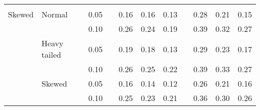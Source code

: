 \begin{table}[ht]
\begin{scriptsize}
\begin{tabular}{ll p{.1cm} c p{.1cm} rrr p{.1cm} rrr}
             &&&&&&&&&&&\\
Skewed       & Normal       && 0.05 &&  0.16 & 0.16 & 0.13 && 0.28 & 0.21 & 0.15 \\ 
             &              && 0.10 &&  0.26 & 0.24 & 0.19 && 0.39 & 0.32 & 0.27 \\ 
             & Heavy tailed && 0.05 &&  0.19 & 0.18 & 0.13 && 0.29 & 0.23 & 0.17 \\ 
             &              && 0.10 &&  0.26 & 0.25 & 0.22 && 0.39 & 0.33 & 0.27 \\ 
             & Skewed       && 0.05 &&  0.16 & 0.14 & 0.12 && 0.26 & 0.21 & 0.16 \\ 
             &              && 0.10 &&  0.25 & 0.23 & 0.21 && 0.36 & 0.30 & 0.26 \\ 

\hline
\end{tabular}
\end{scriptsize}
\end{table}


